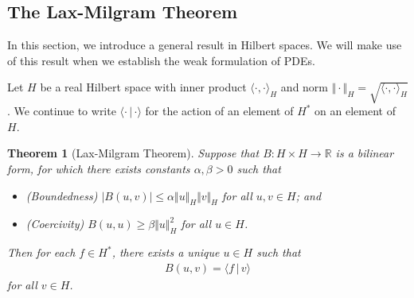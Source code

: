 \documentclass{article}
\numberwithin{equation}{section}
\newcommand{\bbR}{\mathbb{R}}
\theoremstyle{plain}
\newtheorem{theorem}{Theorem}[section]
\theoremstyle{definition}
\begin{document}
\subsection{The Lax-Milgram Theorem}
In this section, we introduce a general result in Hilbert spaces. We will make use of this result when we establish the weak formulation of PDEs. 

Let $H$ be a real Hilbert space with inner product $\langle\cdot,\cdot\rangle_H$ and norm $\Vert\cdot\Vert_H=\sqrt{\langle\cdot,\cdot\rangle_H}$. We continue to write $\langle\cdot\,|\,\cdot\rangle$ for the action of
an element of $H^*$ on an element of $H$.
\begin{theorem}[Lax-Milgram Theorem]\label{laxmil}
Suppose that $B:H\times H\to\bbR$ is a bilinear form, for which there exists constants $\alpha,\beta>0$ such that
\begin{itemize}
\item[(i)] (Boundedness) $\vert B(u,v)\vert\leq\alpha\Vert u\Vert_H\Vert v\Vert_H$ for all $u,v\in H$; and
\item[(ii)] (Coercivity) $B(u,u)\geq\beta\Vert u\Vert_H^2$ for all $u\in H$.
\end{itemize}
Then for each $f\in H^*$, there exists a unique $u\in H$ such that
\begin{align*}
	B(u,v)=\langle f\,|\,v\rangle
\end{align*}
for all $v\in H$.
\end{theorem}
\end{document}
